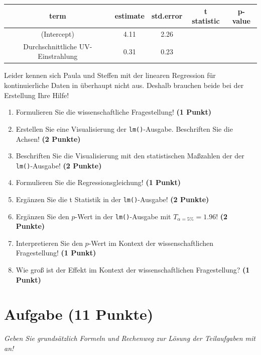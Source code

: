 \documentclass[a4paper, 9pt]{scrartcl}\usepackage[]{graphicx}\usepackage[]{xcolor}
\begin{document}
\begin{table}[!h]
\centering\begingroup\fontsize{11}{13}\selectfont

\begin{tabular}{ccccc}
\toprule
term & estimate & std.error & t statistic & p-value\\
\midrule
(Intercept) & 4.11 & 2.26 &  & \\
Durchschnittliche UV-Einstrahlung & 0.31 & 0.23 &  & \\
\bottomrule
\end{tabular}
\endgroup{}
\end{table}



Leider kennen sich Paula und Steffen mit der linearen Regression für kontinuierliche Daten in \Rlogo überhaupt nicht aus. Deshalb brauchen beide bei der Erstellung Ihre Hilfe!

\begin{enumerate}
\item Formulieren Sie die wissenschaftliche Fragestellung! \textbf{(1 Punkt)}
\item Erstellen  Sie  eine  Visualisierung  der \texttt{lm()}-Ausgabe.  Beschriften  Sie  die  Achsen! \textbf{(2 Punkte)}
\item Beschriften Sie die Visualisierung mit den statistischen Maßzahlen der der \texttt{lm()}-Ausgabe! \textbf{(2 Punkte)}
\item Formulieren Sie die Regressionsgleichung! \textbf{(1 Punkt)}
\item Ergänzen Sie die t Statistik in der \texttt{lm()}-Ausgabe! \textbf{(2 Punkte)}
\item Ergänzen Sie den $p$-Wert in der \texttt{lm()}-Ausgabe mit $T_{\alpha = 5\%} = 1.96$!  \textbf{(2 Punkte)}
\item Interpretieren Sie den $p$-Wert im Kontext der wissenschaftlichen Fragestellung! \textbf{(1 Punkt)}  
\item Wie groß ist der Effekt im Kontext der wissenschaftlichen Fragestellung? \textbf{(1 Punkt)}
\end{enumerate} 
\clearpage

\section{Aufgabe \hfill (11 Punkte)}

\textit{Geben Sie grundsätzlich Formeln und Rechenweg zur Lösung der Teilaufgaben mit an!} \\[1Ex]
 
\end{document}
